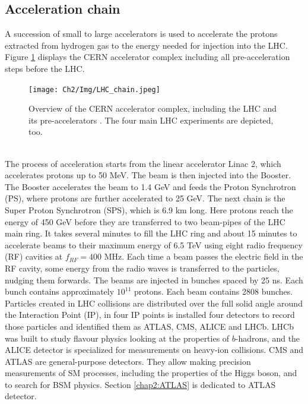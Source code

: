 \subsection{Acceleration chain}
\label{chap2:LHC:chain}
A succession of small to large accelerators is used to accelerate the protons extracted from hydrogen gas to the energy needed for injection into the LHC. Figure \ref{fig:chap2:LHC:chain} displays the CERN accelerator complex including all pre-acceleration steps before the LHC. 
\begin{figure}[htbp]
    \centering
    \texttt{[image: Ch2/Img/LHC\_chain.jpeg]}
    \caption{Overview of the CERN accelerator complex, including the LHC and its pre-accelerators \cite{LHC_chain}. The four main LHC experiments are depicted, too.}
    \label{fig:chap2:LHC:chain}
\end{figure}
\\
The process of acceleration starts from the linear accelerator Linac 2, which accelerates protons up to 50 MeV. The beam is then injected into the Booster. The Booster accelerates the beam to 1.4 GeV and feeds the Proton Synchrotron (PS), where protons are further accelerated to 25 GeV. The next chain is the Super Proton Synchrotron (SPS), which is 6.9 km long. Here protons reach the energy of 450 GeV before they are transferred to two beam-pipes of the LHC main ring. It takes several minutes to fill the LHC ring and about 15 minutes to accelerate beams to their maximum energy of 6.5 TeV using eight radio frequency (RF) cavities at $f_{RF} = 400$ MHz. Each time a beam passes the electric field in the RF cavity, some energy from the radio waves is transferred to the particles, nudging them forwards. The beams are injected in bunches spaced by 25 ns. Each bunch contains approximately $10^{11}$ protons. Each beam contains 2808 bunches. \\
Particles created in LHC collisions are distributed over the full solid angle around the Interaction Point (IP), in four IP points is installed four detectors to record those particles and identified them as ATLAS, CMS, ALICE and LHCb. LHCb was built to study flavour physics looking at the properties of $b$-hadrons, and the ALICE detector is specialized for measurements on heavy-ion collisions. CMS and ATLAS are general-purpose detectors. They allow making precision measurements of SM processes, including the properties of the Higgs boson, and to search for BSM physics. Section \ref{chap2:ATLAS} is dedicated to ATLAS detector.

